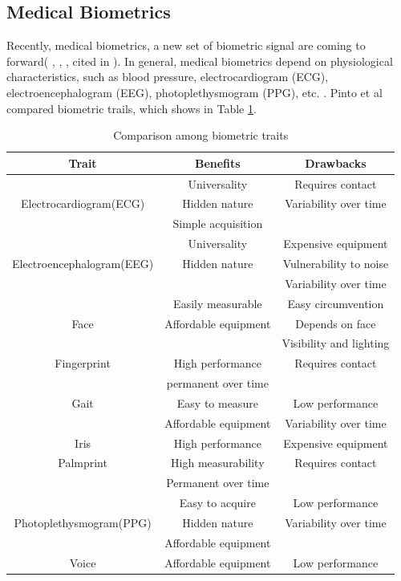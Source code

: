 \documentclass[a4paper,12pt]{article}
\begin{document}
\subsection{Medical Biometrics}
Recently, medical biometrics, a new set of biometric signal are coming to forward( \autocite{Abo:2014biometric}, \autocite{Agrafioti:2012secure}, \autocite{Akhter:2016heart}, cited in  \autocite{Pinto:2018evolution}). In general, medical biometrics depend on physiological characteristics, such as blood pressure, electrocardiogram (ECG), electroencephalogram (EEG), photoplethysmogram (PPG), etc. \autocite{Agrafioti:2011medical}. Pinto et al compared biometric trails, which shows in Table \ref{tab:comparision}.

\begin{table}

\centering
 \begin{tabular}{c c c} 
 Trait & Benefits & Drawbacks \\ [0.5ex] 
 \hline\hline
  & Universality & Requires contact \\ Electrocardiogram(ECG) & Hidden nature & Variability over time \\ & Simple acquisition & \\ 
 \hline
  & Universality & Expensive equipment \\ Electroencephalogram(EEG) & Hidden nature & Vulnerability to noise \\ &  & Variability over time \\ 
 \hline
  & Easily measurable & Easy circumvention \\ Face & Affordable equipment & Depends on face \\ & & Visibility and lighting \\ 
 \hline
  Fingerprint & High performance & Requires contact \\ & permanent over time & \\
 \hline
  Gait & Easy to measure & Low performance \\ & Affordable equipment & Variability over time \\
  \hline
  Iris & High performance & Expensive equipment \\
  \hline
  Palmprint & High measurability & Requires contact \\ & Permanent over time &  \\ 
  \hline
  & Easy to acquire & Low performance \\ Photoplethysmogram(PPG) & Hidden nature & Variability over time \\ & Affordable equipment & \\ 
  \hline
 Voice & Affordable equipment & Low performance \\ [1ex] 
 \hline
\end{tabular}
\caption{Comparison among biometric traits \autocite{Pinto:2018evolution}}
\label{tab:comparision}
\end{table}
\end{document}
